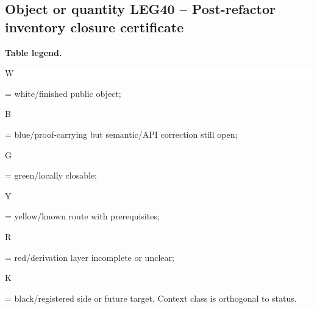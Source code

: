 \subsection*{Object or quantity LEG40 -- Post-refactor inventory closure certificate}
\hypertarget{objproof:LEG40}{}
\par\smallskip\noindent\begin{minipage}{0.99\linewidth}\footnotesize\raggedright\textbf{Table legend.} \colorbox{white}{\strut W} = white/finished public object; \colorbox{cyan!20}{\strut B} = blue/proof-carrying but semantic/API correction still open; \colorbox{green!18}{\strut G} = green/locally closable; \colorbox{yellow!25}{\strut Y} = yellow/known route with prerequisites; \colorbox{red!20}{\strut R} = red/derivation layer incomplete or unclear; \colorbox{black!18}{\strut K} = black/registered side or future target. Context class is orthogonal to status.\end{minipage}\par\vspace{0.25em}
